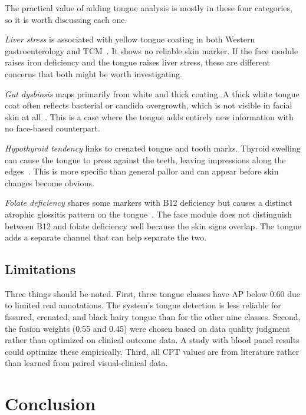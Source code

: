 \documentclass[journal]{IEEEtran}
\begin{document}
The practical value of adding tongue analysis is mostly in these four categories,
so it is worth discussing each one.

\textit{Liver stress} is associated with yellow tongue coating in both Western
gastroenterology and TCM~\cite{whitfield2006,chen2011}. It shows no reliable
skin marker. If the face module raises iron deficiency and the tongue raises
liver stress, these are different concerns that both might be worth investigating.

\textit{Gut dysbiosis} maps primarily from white and thick coating. A thick
white tongue coat often reflects bacterial or candida overgrowth, which is
not visible in facial skin at all~\cite{phua2012}. This is a case where the
tongue adds entirely new information with no face-based counterpart.

\textit{Hypothyroid tendency} links to crenated tongue and tooth marks. Thyroid
swelling can cause the tongue to press against the teeth, leaving impressions
along the edges~\cite{roberts2004}. This is more specific than general pallor
and can appear before skin changes become obvious.

\textit{Folate deficiency} shares some markers with B12 deficiency but causes
a distinct atrophic glossitis pattern on the tongue~\cite{devalia2014}. The face
module does not distinguish between B12 and folate deficiency well because the
skin signs overlap. The tongue adds a separate channel that can help separate
the two.

\subsection{Limitations}

Three things should be noted. First, three tongue classes have AP below 0.60
due to limited real annotations. The system's tongue detection is less reliable
for fissured, crenated, and black hairy tongue than for the other nine classes.
Second, the fusion weights (0.55 and 0.45) were chosen based on data quality
judgment rather than optimized on clinical outcome data. A study with blood
panel results could optimize these empirically. Third, all CPT values are from
literature rather than learned from paired visual-clinical data.

\section{Conclusion}
\label{sec:conclusion}
\end{document}
